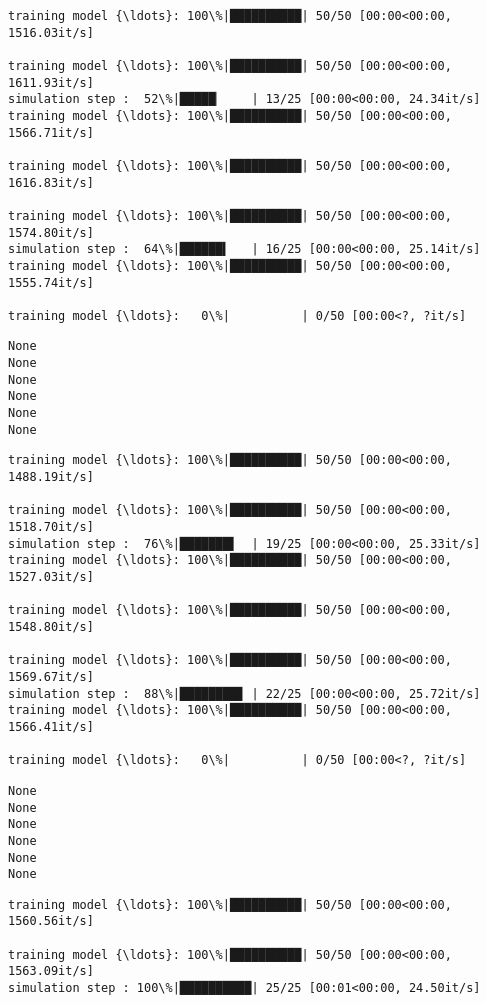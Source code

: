 \documentclass[11pt]{article}
\begin{document}
    \begin{Verbatim}[commandchars=\\\{\}]
training model {\ldots}: 100\%|██████████| 50/50 [00:00<00:00, 1516.03it/s]

training model {\ldots}: 100\%|██████████| 50/50 [00:00<00:00, 1611.93it/s]
simulation step :  52\%|█████▏    | 13/25 [00:00<00:00, 24.34it/s]
training model {\ldots}: 100\%|██████████| 50/50 [00:00<00:00, 1566.71it/s]

training model {\ldots}: 100\%|██████████| 50/50 [00:00<00:00, 1616.83it/s]

training model {\ldots}: 100\%|██████████| 50/50 [00:00<00:00, 1574.80it/s]
simulation step :  64\%|██████▍   | 16/25 [00:00<00:00, 25.14it/s]
training model {\ldots}: 100\%|██████████| 50/50 [00:00<00:00, 1555.74it/s]

training model {\ldots}:   0\%|          | 0/50 [00:00<?, ?it/s]
    \end{Verbatim}

    \begin{Verbatim}[commandchars=\\\{\}]
None
None
None
None
None
None
    \end{Verbatim}

    \begin{Verbatim}[commandchars=\\\{\}]
training model {\ldots}: 100\%|██████████| 50/50 [00:00<00:00, 1488.19it/s]

training model {\ldots}: 100\%|██████████| 50/50 [00:00<00:00, 1518.70it/s]
simulation step :  76\%|███████▌  | 19/25 [00:00<00:00, 25.33it/s]
training model {\ldots}: 100\%|██████████| 50/50 [00:00<00:00, 1527.03it/s]

training model {\ldots}: 100\%|██████████| 50/50 [00:00<00:00, 1548.80it/s]

training model {\ldots}: 100\%|██████████| 50/50 [00:00<00:00, 1569.67it/s]
simulation step :  88\%|████████▊ | 22/25 [00:00<00:00, 25.72it/s]
training model {\ldots}: 100\%|██████████| 50/50 [00:00<00:00, 1566.41it/s]

training model {\ldots}:   0\%|          | 0/50 [00:00<?, ?it/s]
    \end{Verbatim}

    \begin{Verbatim}[commandchars=\\\{\}]
None
None
None
None
None
None
    \end{Verbatim}

    \begin{Verbatim}[commandchars=\\\{\}]
training model {\ldots}: 100\%|██████████| 50/50 [00:00<00:00, 1560.56it/s]

training model {\ldots}: 100\%|██████████| 50/50 [00:00<00:00, 1563.09it/s]
simulation step : 100\%|██████████| 25/25 [00:01<00:00, 24.50it/s]
    \end{Verbatim}
\end{document}
